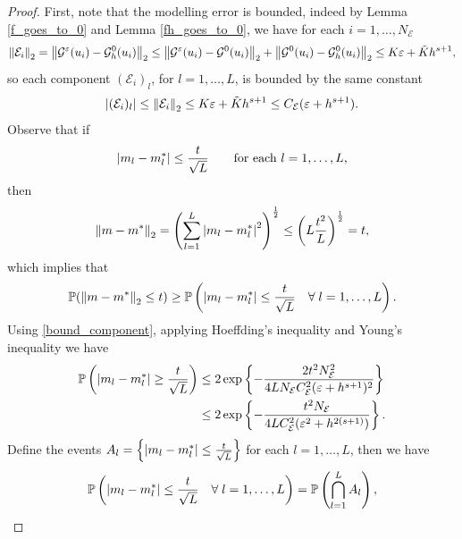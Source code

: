 \documentclass[10pt]{article}
\begin{document}
\begin{proof}
First, note that the modelling error is bounded, indeed by Lemma \ref{f_goes_to_0} and Lemma \ref{fh_goes_to_0}, we have for each $i = 1, \dots, N_{\mathcal{E}}$
\begin{equation*}
\left\|\mathcal{E}_i\right\|_2 = \left\|\mathcal{G}^{\varepsilon}(u_i) - \mathcal{G}^0_h(u_i)\right\|_2 \le \left\|\mathcal{G}^{\varepsilon}(u_i) - \mathcal{G}^0(u_i)\right\|_2 + \left\|\mathcal{G}^0(u_i) - \mathcal{G}^0_h(u_i)\right\|_2 \le K \varepsilon + \tilde{K} h^{s+1},
\end{equation*}
so each component $(\mathcal{E}_i)_l$, for $l = 1, \dots, L$, is bounded by the same constant
\begin{equation}
\label{bound_component}
\left\lvert(\mathcal{E}_i)_l\right\rvert \le \left\|\mathcal{E}_i\right\|_2 \le K \varepsilon + \tilde{K} h^{s+1} \le C_{\mathcal{E}} ( \varepsilon + h^{s+1} ).
\end{equation}
Observe that if
\[ \left\lvert m_l - m^*_l\right\rvert \le \frac{t}{\sqrt{L}} \qquad \text{for each } l = 1, \dots, L, \]
then
\begin{equation*}
\left\|m - m^*\right\|_2 = \left ( \sum_{l=1}^L \left\lvert m_l - m^*_l\right\rvert^2 \right )^{\frac{1}{2}} \le \left ( L \frac{t^2}{L} \right )^{\frac{1}{2}} = t,
\end{equation*}
which implies that
\begin{equation}
\label{1toL}
\mathbb{P}( \left\|m - m^*\right\|_2 \le t ) \ge \mathbb{P} \left ( \left\lvert m_l - m^*_l\right\rvert \le \frac{t}{\sqrt{L}} \quad \forall \; l = 1, \dots, L \right ).
\end{equation}
Using \eqref{bound_component}, applying Hoeffding's inequality and Young's inequality we have
\begin{equation}
\begin{aligned}
\label{hoeffding}
\mathbb{P} \left ( \left\lvert m_l - m^*_l\right\rvert \ge \frac{t}{\sqrt{L}} \right ) &\le 2 \exp \left \{ - \frac{2 t^2 N_{\mathcal{E}}^2}{4 L N_{\mathcal{E}} C_{\mathcal{E}}^2 (\varepsilon + h^{s+1})^2 } \right \} \\
&\le 2 \exp \left \{ - \frac{t^2 N_{\mathcal{E}}}{4 L C_{\mathcal{E}}^2 (\varepsilon^2 + h^{2(s+1)})} \right \}.
\end{aligned}
\end{equation}
Define the events $A_l = \left \{ \left\lvert m_l - m^*_l\right\rvert \le \frac{t}{\sqrt{L}} \right \}$ for each $l = 1, \dots, L$, then we have
\begin{equation*}
\mathbb{P} \left ( \abs{m_l - m^*_l} \le \frac{t}{\sqrt{L}} \quad \forall \; l = 1, \dots, L \right ) = \mathbb{P} \left ( \bigcap_{l=1}^L A_l \right ),

\end{equation*}
\end{proof}
\end{document}
